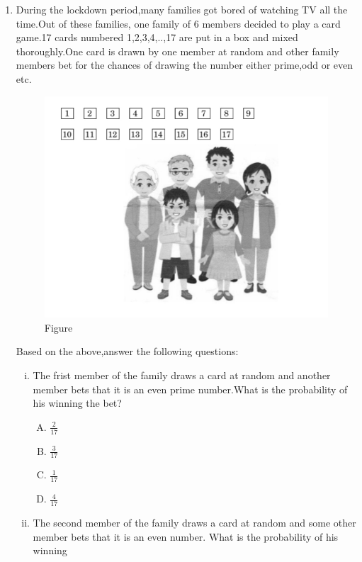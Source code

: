 \documentclass[12pt]{article}
\begin{document}
\begin{enumerate}
	\item During the lockdown period,many families got bored of watching TV all the time.Out of these families, one family of 6 members decided to play a card game.17 cards numbered 1,2,3,4,..,17 are put in a box and mixed thoroughly.One card is drawn by one member at random and other family members bet for the chances of drawing the number either prime,odd or even etc.

\begin{figure}[h]
    \centering
    \includegraphics[width=\columnwidth]{figs/fig.png}
    \caption{Figure}
    \label{fig:Figure}
\end{figure}
Based on the above,answer the following questions:
\begin{enumerate}[(i)]
	\item The frist member of the family draws a card at random and another member bets that it is an even prime number.What is the probability of his winning the bet?
\begin{enumerate}[(A)]
	\item $\frac{2}{17}$
	\item $\frac{3}{17}$
        \item $\frac{1}{17}$
        \item $\frac{4}{17}$
\end{enumerate}
       \item The second member of the family draws a card at random and some other 
member bets that it is an even number. What is the probability of his winning 

\end{enumerate}
\end{enumerate}
\end{document}

